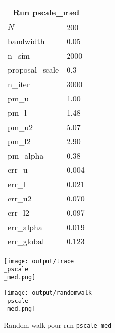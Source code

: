 
\begin{figure}[H]
  \centering
  \begin{minipage}[t]{0.45\textwidth}
    \vspace{0pt}
    \footnotesize
    \begin{tabular}{|l|l|}\hline
    \multicolumn{2}{|c|}{\textbf{Run pscale\_med}} \\ \hline
    $N$ & 200 \\ \hline
    bandwidth & 0.05 \\ \hline
    n\_sim & 2000 \\ \hline
    proposal\_scale & 0.3 \\ \hline
    n\_iter & 3000 \\ \hline
    pm\_u & 1.00 \\ \hline
    pm\_l & 1.48 \\ \hline
    pm\_u2 & 5.07 \\ \hline
    pm\_l2 & 2.90 \\ \hline
    pm\_alpha & 0.38 \\ \hline
    err\_u & 0.004 \\ \hline
    err\_l & 0.021 \\ \hline
    err\_u2 & 0.070 \\ \hline
    err\_l2 & 0.097 \\ \hline
    err\_alpha & 0.019 \\ \hline
    err\_global & 0.123 \\ \hline
    \end{tabular}
  \end{minipage}
  \hfill
  \begin{minipage}[t]{0.45\textwidth}
    \vspace{0pt}
    \texttt{[image: output/trace\\\_pscale\\\_med.png]}
  \end{minipage}
\end{figure}

\begin{figure}[H]
  \centering
  \texttt{[image: output/randomwalk\\\_pscale\\\_med.png]}
  \caption{Random-walk pour run \texttt{pscale\_med}}
\end{figure}

